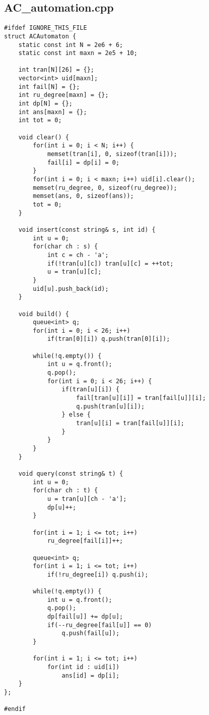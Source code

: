 \documentclass[UTF8, a4paper, titlepage, twoside]{ctexart}
\begin{document}
\subsection{AC_automation.cpp}
\begin{verbatim}
#ifdef IGNORE_THIS_FILE
struct ACAutomaton {
    static const int N = 2e6 + 6;
    static const int maxn = 2e5 + 10;
    
    int tran[N][26] = {};
    vector<int> uid[maxn];
    int fail[N] = {};
    int ru_degree[maxn] = {};
    int dp[N] = {};
    int ans[maxn] = {};
    int tot = 0;

    void clear() {
        for(int i = 0; i < N; i++) {
            memset(tran[i], 0, sizeof(tran[i]));
            fail[i] = dp[i] = 0;
        }
        for(int i = 0; i < maxn; i++) uid[i].clear();
        memset(ru_degree, 0, sizeof(ru_degree));
        memset(ans, 0, sizeof(ans));
        tot = 0;
    }

    void insert(const string& s, int id) {
        int u = 0;
        for(char ch : s) {
            int c = ch - 'a';
            if(!tran[u][c]) tran[u][c] = ++tot;
            u = tran[u][c];
        }
        uid[u].push_back(id);
    }

    void build() {
        queue<int> q;
        for(int i = 0; i < 26; i++)
            if(tran[0][i]) q.push(tran[0][i]);
        
        while(!q.empty()) {
            int u = q.front();
            q.pop();
            for(int i = 0; i < 26; i++) {
                if(tran[u][i]) {
                    fail[tran[u][i]] = tran[fail[u]][i];
                    q.push(tran[u][i]);
                } else {
                    tran[u][i] = tran[fail[u]][i];
                }
            }
        }
    }

    void query(const string& t) {
        int u = 0;
        for(char ch : t) {
            u = tran[u][ch - 'a'];
            dp[u]++;
        }

        for(int i = 1; i <= tot; i++)
            ru_degree[fail[i]]++;
        
        queue<int> q;
        for(int i = 1; i <= tot; i++)
            if(!ru_degree[i]) q.push(i);
        
        while(!q.empty()) {
            int u = q.front();
            q.pop();
            dp[fail[u]] += dp[u];
            if(--ru_degree[fail[u]] == 0)
                q.push(fail[u]);
        }

        for(int i = 1; i <= tot; i++)
            for(int id : uid[i])
                ans[id] = dp[i];
    }
};

#endif
\end{verbatim}
\end{document}
